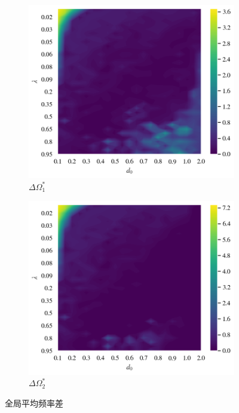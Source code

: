 \documentclass{article}
\begin{document}
\begin{figure}[H]
	\centering
	\begin{subfigure}[b]{0.49\textwidth}
		\includegraphics[width=\textwidth]{./figs/clusterDeltaOmega1.png}
		\vspace{-1cm}
		\caption{$\Delta \Omega _{1}^{*}$}
	\end{subfigure}
	\begin{subfigure}[b]{0.49\textwidth}
		\includegraphics[width=\textwidth]{./figs/clusterDeltaOmega2.png}
		\vspace{-1cm}
		\caption{$\Delta \Omega _{2}^{*}$}
	\end{subfigure}
	\vspace{-0.5cm}
	\caption{全局平均频率差}
	\label{fig:fig2.5.cluster}
\end{figure}
\end{document}

